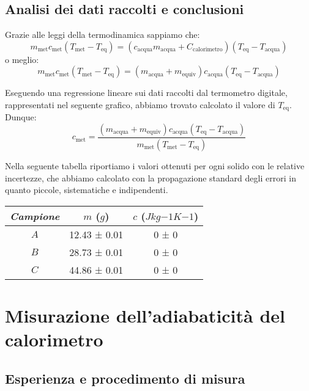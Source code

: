 \documentclass{article}
\begin{document}
\subsection{Analisi dei dati raccolti e conclusioni}
Grazie alle leggi della termodinamica sappiamo che:
    \[
        m_\text{met} c_\text{met} (T_\text{met}-T_\text{eq}) =
        (c_\text{acqua} m_\text{acqua} + C_\text{calorimetro}) (T_\text{eq}-T_\text{acqua})
    \]   
o meglio:
    \[
        m_\text{met} c_\text{met} (T_\text{met}-T_\text{eq}) =
        (m_\text{acqua} + m_\text{equiv}) c_\text{acqua} (T_\text{eq}-T_\text{acqua})
    \]

Eseguendo una regressione lineare sui dati raccolti dal termometro digitale, rappresentati nel    %
seguente grafico, abbiamo trovato calcolato il valore di $T_\text{eq}$. Dunque:
    \[
        c_\text{met} = \frac{(m_\text{acqua} + m_\text{equiv}) c_\text{acqua} (T_\text{eq}-T_\text{acqua})}
        {m_\text{met} (T_\text{met}-T_\text{eq})}
    \]

Nella seguente tabella riportiamo i valori ottenuti per ogni solido con le relative incertezze, che abbiamo calcolato con la
propagazione standard degli errori in quanto piccole, sistematiche e indipendenti.

\begin{center}
    \begin{tabular}{ |c|c|c| }
        \hline
        \emph{Campione} & $m$ ($\unit{g}$) & $c$ ($\unit{J kg{-1} K{-1} }$) \\
        \hline
        $A$ & 12.43 ± 0.01 & 0 ± 0 \\
        $B$ & 28.73 ± 0.01 & 0 ± 0 \\    %
        $C$ & 44.86 ± 0.01 & 0 ± 0 \\
        \hline
    \end{tabular}
\end{center}



\section{Misurazione dell'adiabaticità del calorimetro}
    
\subsection{Esperienza e procedimento di misura}
\end{document}
